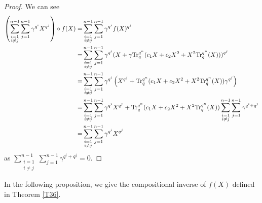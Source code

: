 \documentclass[11pt]{amsart}
\theoremstyle{plain}
\numberwithin{equation}{section}
\theoremstyle{definition}
\def\Tr{{\rm Tr}}
\begin{document}
\begin{proof}
    We can see 
    \begin{equation*}
        \begin{split}
            \left(\displaystyle\sum_{\substack{i=1\\ i\neq j}}^{n-1}\sum_{j=1}^{n-1}\gamma^{q^i}X^{q^j}\right) \circ f(X)=&\displaystyle\sum_{\substack{i=1\\ i\neq j}}^{n-1}\sum_{j=1}^{n-1}\gamma^{q^i}f(X)^{q^j}
            \\=&\displaystyle\sum_{\substack{i=1\\ i\neq j}}^{n-1}\sum_{j=1}^{n-1}\gamma^{q^i}(X+\gamma \Tr_{q}^{q^n}(c_1X+c_2X^2+X^2\Tr_{q}^{q^n}(X)))^{q^j}
            \\=&\displaystyle\sum_{\substack{i=1\\ i\neq j}}^{n-1}\sum_{j=1}^{n-1}\gamma^{q^i}\left(X^{q^j}+\Tr_{q}^{q^n}(c_1X+c_2X^2+X^2\Tr_{q}^{q^n}(X))\gamma^{q^j}\right)
            \\=&\displaystyle\sum_{\substack{i=1\\ i\neq j}}^{n-1}\sum_{j=1}^{n-1}\gamma^{q^i}X^{q^j}+\Tr_{q}^{q^n}(c_1X+c_2X^2+X^2\Tr_{q}^{q^n}(X))\displaystyle\sum_{\substack{i=1\\ i\neq j}}^{n-1}\sum_{j=1}^{n-1}\gamma^{q^i+q^j}
            \\=&\displaystyle\sum_{\substack{i=1\\ i\neq j}}^{n-1}\sum_{j=1}^{n-1}\gamma^{q^i}X^{q^j}
        \end{split}
    \end{equation*}
    as $\displaystyle\sum_{\substack{i=1\\ i\neq j}}^{n-1}\sum_{j=1}^{n-1}\gamma^{q^i+q^j}=0.$
\end{proof}
In the following proposition, we give the compositional inverse of $f(X)$ defined in Theorem \ref{T36}.
\end{document}
